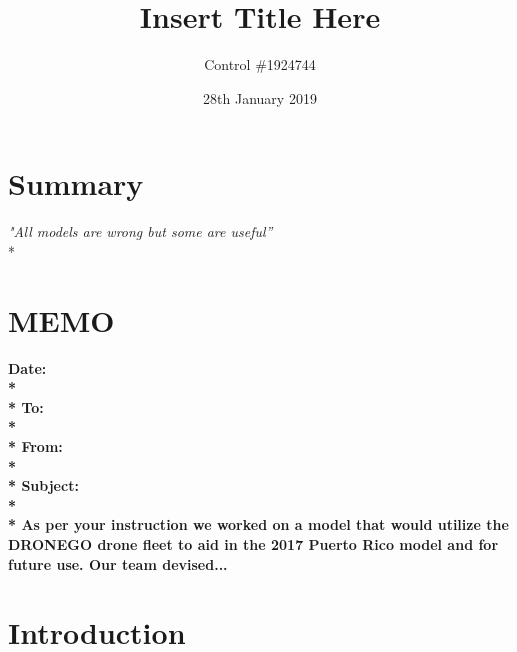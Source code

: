 \documentclass[a4paper,12pt]{article}
\begin{document}
\title{Insert Title Here}
\author{Control \#1924744}
\date{28th January 2019}
\maketitle
\newpage


\section*{\hfil Summary\hfil}
\begin{center}
\textit{"All models are wrong but some are useful''} \\*
\end{center}

\newpage

\section*{\hfil MEMO\hfil}
\hrulefill

\bf{Date:} \\*\\*
\bf{To:} \\*\\*
\bf{From:} \\*\\*
\bf{Subject:} \\*\\*
\hrulefill
As per your instruction we worked on a model that would utilize the DRONEGO drone fleet to aid in the 2017 Puerto Rico model and for future use.
Our team devised...

\newpage


\tableofcontents
\newpage
{}


\newpage


\section{Introduction}
\end{document}

